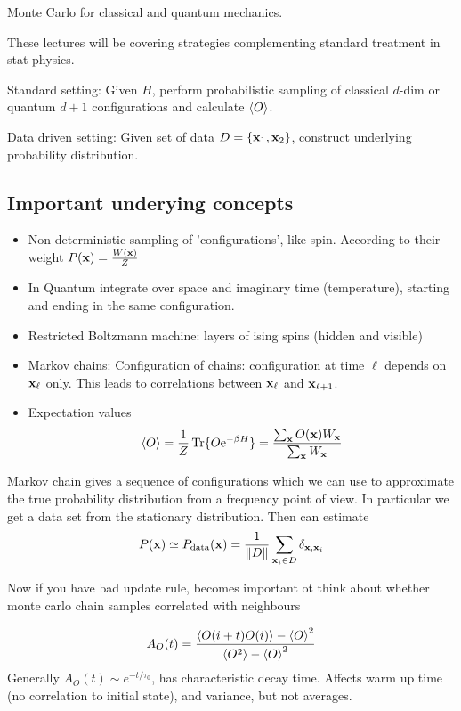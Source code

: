\documentclass[a4paper]{article}
\author{Oscar Emil Sommer}
\begin{document}
Monte Carlo for classical and quantum mechanics.

These lectures will be covering strategies complementing standard treatment in
stat physics.


Standard setting:
Given $H$, perform probabilistic sampling of classical $d$-dim or quantum $d+1$
configurations and calculate $\braket{O}$.

Data driven setting:
Given set of data $D=\{\mathbf{x}_1,\mathbf{x}_2\}$, construct underlying probability
distribution.

\subsection{Important underying concepts}
\begin{itemize}
    \item Non-deterministic sampling of 'configurations', like spin. According
        to their weight $P(\mathbf{x})=\frac{W(\mathbf x)}{Z}$
    \item In Quantum integrate over space and imaginary time (temperature),
        starting and ending in the same configuration.
    \item Restricted Boltzmann machine: layers of ising spins (hidden and visible)

    \item Markov chains: Configuration of chains: configuration at time $\ell$ depends on
$\mathbf {x}_\ell$ only. This leads to correlations between $\mathbf{x}_\ell$ and
$\mathbf{x}_{\ell+1}$. 
\item Expectation values 
    \[\braket{O}=\frac{1}{Z}\operatorname{Tr}\{O\mathrm{e}^{-\beta H}\}=\frac{\sum_{\mathbf x} O(\mathbf x)
    W_{\mathbf x}}{\sum_{\mathbf x} W_{\mathbf{x}}}\]
\end{itemize}
Markov chain gives a sequence of configurations which we can use to approximate
the true probability distribution from a frequency point of view. In particular
we get a data set from the stationary distribution. Then can estimate 
\[ P(\mathbf x)\simeq P_\mathrm{data}(\mathbf x)=\frac{1}{\lVert D\rVert}\sum_{\mathbf
x_i\in D} \delta_{\mathbf x,\mathbf x_i}\]

Now if you have bad update rule, becomes important ot think about whether monte
carlo chain samples correlated with neighbours

\[A_O(t) =\frac{\braket{O(i+t)O(i)}-\braket{O}^2}{\braket{O^2}-\braket{O}^2}\]
Generally $A_O(t)\sim e^{-t/\tau_0}$, has characteristic decay time.  Affects
warm up time (no correlation to initial state), and variance, but not averages.
\end{document}
